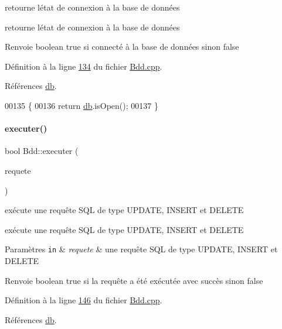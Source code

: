 retourne l\textquotesingle{}état de connexion à la base de données 

retourne l\textquotesingle{}état de connexion à la base de données \begin{DoxyReturn}{Renvoie}
boolean true si connecté à la base de données sinon false 
\end{DoxyReturn}


Définition à la ligne \hyperlink{_bdd_8cpp_source_l00134}{134} du fichier \hyperlink{_bdd_8cpp_source}{Bdd.\+cpp}.



Références \hyperlink{_bdd_8h_source_l00063}{db}.


\begin{DoxyCode}
00135 \{
00136     \textcolor{keywordflow}{return} \hyperlink{class_bdd_a8628c1686deda86999f86689c3e7268e}{db}.isOpen();
00137 \}
\end{DoxyCode}
\mbox{\label{class_bdd_ab6ae645b4b54ce5df8dc9b422fb39faa}} 
\paragraph{\texorpdfstring{executer()}{executer()}}
{\footnotesize\ttfamily bool Bdd\+::executer (\begin{DoxyParamCaption}\item[{Q\+String}]{requete }\end{DoxyParamCaption})}



exécute une requête S\+QL de type U\+P\+D\+A\+TE, I\+N\+S\+E\+RT et D\+E\+L\+E\+TE 

exécute une requête S\+QL de type U\+P\+D\+A\+TE, I\+N\+S\+E\+RT et D\+E\+L\+E\+TE 
\begin{DoxyParams}[1]{Paramètres}
\mbox{\tt in}  & {\em requete} & une requête S\+QL de type U\+P\+D\+A\+TE, I\+N\+S\+E\+RT et D\+E\+L\+E\+TE \\
\hline
\end{DoxyParams}
\begin{DoxyReturn}{Renvoie}
boolean true si la requête a été exécutée avec succès sinon false 
\end{DoxyReturn}


Définition à la ligne \hyperlink{_bdd_8cpp_source_l00146}{146} du fichier \hyperlink{_bdd_8cpp_source}{Bdd.\+cpp}.



Références \hyperlink{_bdd_8h_source_l00063}{db}.



